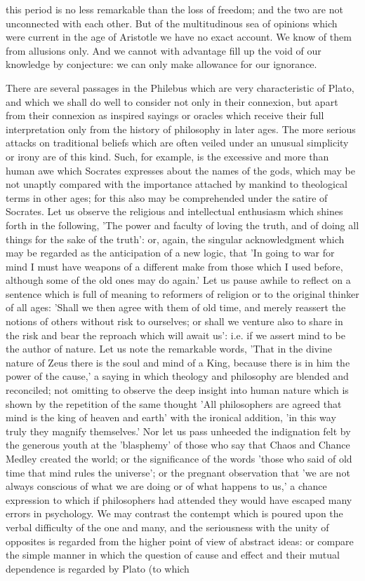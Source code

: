 \documentclass[11pt,letter]{article}
\begin{document}
this period is no less remarkable than the loss of freedom; and the two are not unconnected with each other. But of the multitudinous sea of opinions which were current in the age of Aristotle we have no exact account. We know of them from allusions only. And we cannot with advantage fill up the void of our knowledge by conjecture: we can only make allowance for our ignorance.

\par  There are several passages in the Philebus which are very characteristic of Plato, and which we shall do well to consider not only in their connexion, but apart from their connexion as inspired sayings or oracles which receive their full interpretation only from the history of philosophy in later ages. The more serious attacks on traditional beliefs which are often veiled under an unusual simplicity or irony are of this kind. Such, for example, is the excessive and more than human awe which Socrates expresses about the names of the gods, which may be not unaptly compared with the importance attached by mankind to theological terms in other ages; for this also may be comprehended under the satire of Socrates. Let us observe the religious and intellectual enthusiasm which shines forth in the following, 'The power and faculty of loving the truth, and of doing all things for the sake of the truth': or, again, the singular acknowledgment which may be regarded as the anticipation of a new logic, that 'In going to war for mind I must have weapons of a different make from those which I used before, although some of the old ones may do again.' Let us pause awhile to reflect on a sentence which is full of meaning to reformers of religion or to the original thinker of all ages: 'Shall we then agree with them of old time, and merely reassert the notions of others without risk to ourselves; or shall we venture also to share in the risk and bear the reproach which will await us': i.e. if we assert mind to be the author of nature. Let us note the remarkable words, 'That in the divine nature of Zeus there is the soul and mind of a King, because there is in him the power of the cause,' a saying in which theology and philosophy are blended and reconciled; not omitting to observe the deep insight into human nature which is shown by the repetition of the same thought 'All philosophers are agreed that mind is the king of heaven and earth' with the ironical addition, 'in this way truly they magnify themselves.' Nor let us pass unheeded the indignation felt by the generous youth at the 'blasphemy' of those who say that Chaos and Chance Medley created the world; or the significance of the words 'those who said of old time that mind rules the universe'; or the pregnant observation that 'we are not always conscious of what we are doing or of what happens to us,' a chance expression to which if philosophers had attended they would have escaped many errors in psychology. We may contrast the contempt which is poured upon the verbal difficulty of the one and many, and the seriousness with the unity of opposites is regarded from the higher point of view of abstract ideas: or compare the simple manner in which the question of cause and effect and their mutual dependence is regarded by Plato (to which 
\end{document}
